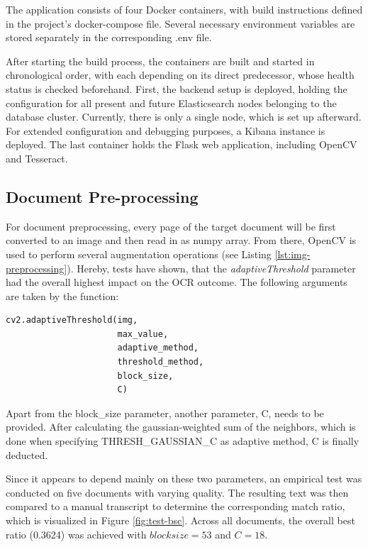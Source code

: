 \documentclass[12pt]{article}
\begin{document}
\noindent The application consists of four Docker containers, with build instructions defined in the project's docker-compose file. Several necessary environment variables are stored separately in the corresponding .env file.

After starting the build process, the containers are built and started in chronological order, with each depending on its direct predecessor, whose health status is checked beforehand. First, the backend setup is deployed, holding the configuration for all present and future Elasticsearch nodes belonging to the database cluster. Currently, there is only a single node, which is set up afterward. For extended configuration and debugging purposes, a Kibana instance is deployed. The last container holds the Flask web application, including OpenCV and Tesseract.

\subsection{Document Pre-processing}
\label{ssec:preprocessing}

For document preprocessing, every page of the target document will be first converted to an image and then read in as numpy array. From there, OpenCV is used to perform several augmentation operations (see Listing \ref{lst:img-preprocessing}). Hereby, tests have shown, that the \textit{adaptiveThreshold} parameter had the overall highest impact on the OCR outcome. The following arguments are taken by the function:

\begin{lstlisting}[language=Python, label=lst:adaptiveThreshold, caption={OpenCV adaptiveThreshold Function}]
cv2.adaptiveThreshold(img, 
                      max_value, 
                      adaptive_method, 
                      threshold_method, 
                      block_size, 
                      C)
\end{lstlisting}

\noindent Apart from the block\_size parameter, another parameter, C, needs to be provided. After calculating the gaussian-weighted sum of the neighbors, which is done when specifying THRESH\_GAUSSIAN\_C as adaptive method, C is finally deducted.

Since it appears to depend mainly on these two parameters, an empirical test was conducted on five documents with varying quality. The resulting text was then compared to a manual transcript to determine the corresponding match ratio, which is visualized in  Figure \ref{fig:test-bsc}. Across all documents, the overall best ratio (0.3624) was achieved with $ blocksize = 53 $ and $ C = 18 $.
\end{document}
